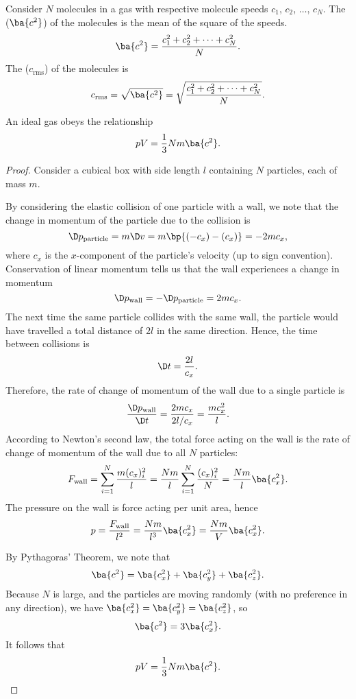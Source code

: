 \begin{definition}
    Consider $N$ molecules in a gas with respective molecule speeds $c_1$, $c_2$, $\dots$, $c_N$. The  ($\ba{c^2}$) of the molecules is the mean of the square of the speeds. \[\ba{c^2} = \frac{c_1^2 + c_2^2 + \dots + c_N^2}{N}.\] The  ($c_{\text{rms}}$) of the molecules is \[c_{\text{rms}} = \sqrt{\ba{c^2}} = \sqrt{\frac{c_1^2 + c_2^2 + \dots + c_N^2}{N}}.\]
\end{definition}

\begin{proposition}
    An ideal gas obeys the relationship \[pV = \frac13 Nm \ba{c^2}.\]
\end{proposition}
\begin{proof}
    Consider a cubical box with side length $l$ containing $N$ particles, each of mass $m$.
    
    By considering the elastic collision of one particle with a wall, we note that the change in momentum of the particle due to the collision is \[\D p_{\text{particle}} = m \D v = m \bp{(-c_x) - (c_x)} = -2mc_x,\] where $c_x$ is the $x$-component of the particle's velocity (up to sign convention). Conservation of linear momentum tells us that the wall experiences a change in momentum \[\D p_{\text{wall}} = -\D p_{\text{particle}} = 2m c_x.\] The next time the same particle collides with the same wall, the particle would have travelled a total distance of $2l$ in the same direction. Hence, the time between collisions is \[\D t = \frac{2l}{c_x}.\] Therefore, the rate of change of momentum of the wall due to a single particle is \[\frac{\D p_{\text{wall}}}{\D t} = \frac{2mc_x}{2l/c_x} = \frac{mc_x^2}{l}.\] According to Newton's second law, the total force acting on the wall is the rate of change of momentum of the wall due to all $N$ particles: \[F_{\text{wall}} = \sum_{i = 1}^N \frac{m(c_x)_i^2}{l} = \frac{Nm}{l} \sum_{i = 1}^N \frac{(c_x)_i^2}{N} = \frac{Nm}{l} \ba{c_x^2}.\] The pressure on the wall is force acting per unit area, hence \[p = \frac{F_{\text{wall}}}{l^2} = \frac{Nm}{l^3} \ba{c_x^2} = \frac{Nm}{V} \ba{c_x^2}.\] 
    
    By Pythagoras' Theorem, we note that \[\ba{c^2} = \ba{c_x^2} + \ba{c_y^2} + \ba{c_z^2}.\] Because $N$ is large, and the particles are moving randomly (with no preference in any direction), we have $\ba{c_x^2} = \ba{c_y^2} = \ba{c_z^2}$, so \[\ba{c^2} = 3\ba{c_x^2}.\] It follows that \[pV = \frac13 Nm \ba{c^2}.\]
\end{proof}

